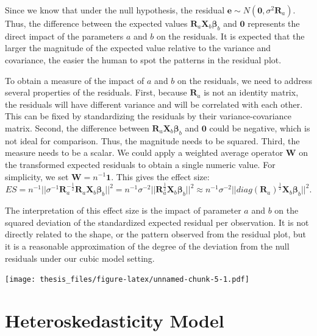 \documentclass{monashthesis}
\begin{document}
Since we know that under the null hypothesis, the residual \(\boldsymbol{e}\sim N(\boldsymbol{0},\sigma^2\boldsymbol{R}_a)\). Thus, the difference between the expected values \(\boldsymbol{R}_a\boldsymbol{X}_b\boldsymbol{\beta}_b\) and \(\boldsymbol{0}\) represents the direct impact of the parameters \(a\) and \(b\) on the residuals. It is expected that the larger the magnitude of the expected value relative to the variance and covariance, the easier the human to spot the patterns in the residual plot.

To obtain a measure of the impact of \(a\) and \(b\) on the residuals, we need to address several properties of the residuals. First, because \(\boldsymbol{R}_a\) is not an identity matrix, the residuals will have different variance and will be correlated with each other. This can be fixed by standardizing the residuals by their variance-covariance matrix. Second, the difference between \(\boldsymbol{R}_a\boldsymbol{X}_b\boldsymbol{\beta}_b\) and \(\boldsymbol{0}\) could be negative, which is not ideal for comparison. Thus, the magnitude needs to be squared. Third, the measure needs to be a scalar. We could apply a weighted average operator \(\boldsymbol{W}\) on the transformed expected residuals to obtain a single numeric value. For simplicity, we set \(\boldsymbol{W}=n^{-1}\boldsymbol{1}\). This gives the effect size: \[ES=n^{-1}||\sigma^{-1}\boldsymbol{R}_a^{-\frac{1}{2}}\boldsymbol{R}_a\boldsymbol{X}_b\boldsymbol{\beta}_b||^2=n^{-1}\sigma^{-2}||\boldsymbol{R}_a^{\frac{1}{2}}\boldsymbol{X}_b\boldsymbol{\beta}_b||^2\approx n^{-1}\sigma^{-2}||diag(\boldsymbol{R}_a)^{\frac{1}{2}}\boldsymbol{X}_b\boldsymbol{\beta}_b||^2.\]

The interpretation of this effect size is the impact of parameter \(a\) and \(b\) on the squared deviation of the standardized expected residual per observation. It is not directly related to the shape, or the pattern observed from the residual plot, but it is a reasonable approximation of the degree of the deviation from the null residuals under our cubic model setting.

\texttt{[image: thesis\_files/figure-latex/unnamed-chunk-5-1.pdf]}

\hypertarget{section}{%
\subsection{}\label{section}}

\hypertarget{heteroskedasticity-model}{%
\section{Heteroskedasticity Model}\label{heteroskedasticity-model}}
\end{document}
